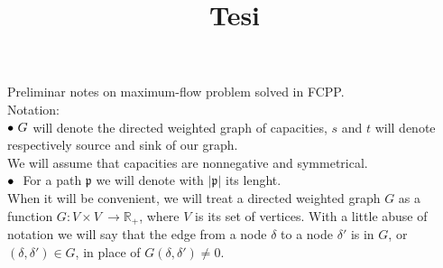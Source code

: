 \documentclass{article}
\title{Tesi}
\author{}
\date{}
\theoremstyle{plain}
\theoremstyle{remark}
\begin{document}
Preliminar notes on maximum-flow problem solved in FCPP.\\
Notation:\\
 $\small\bullet\ G$ will denote the directed weighted graph of capacities, 
 $s$ and $t$ will denote respectively source and sink of our graph.\\
We will assume that capacities are nonnegative and symmetrical.\\
 $\small\bullet\ $  For a path $\mathfrak{p}$ we will denote with $|\mathfrak{p}|$ its lenght.\\

When it will be convenient, we will treat a directed weighted graph $G$ as a function $G: V\times V\ \rightarrow \mathbb{R_{+}}$, where $V$ is its set of vertices. With a little abuse of notation we will say that the edge from a node $\delta$ to a node $\delta'$ is in $G$, or $(\delta, \delta') \in G$,  in place of $G(\delta, \delta') \not= 0$.\\
\end{document}
